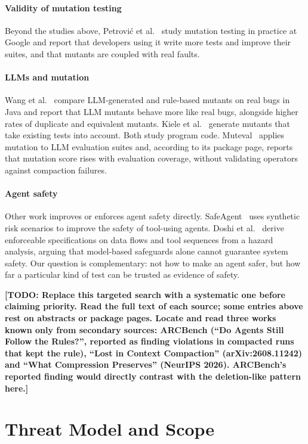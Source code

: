 \documentclass[manuscript,screen,nonacm]{acmart}
\newcommand{\todo}[1]{\textbf{[TODO: #1]}}
\begin{document}
\paragraph{Validity of mutation testing} Beyond the studies above, Petrovi\'c et al.~\cite{petrovic2021} study mutation testing in practice at Google and report that developers using it write more tests and improve their suites, and that mutants are coupled with real faults.

\paragraph{LLMs and mutation} Wang et al.~\cite{wang2024} compare LLM-generated and rule-based mutants on real bugs in Java and report that LLM mutants behave more like real bugs, alongside higher rates of duplicate and equivalent mutants. Kiele et al.~\cite{kiele2026} generate mutants that take existing tests into account. Both study program code. Muteval~\cite{muteval} applies mutation to LLM evaluation suites and, according to its package page, reports that mutation score rises with evaluation coverage, without validating operators against compaction failures.

\paragraph{Agent safety} Other work improves or enforces agent safety directly. SafeAgent~\cite{zhou2026} uses synthetic risk scenarios to improve the safety of tool-using agents. Doshi et al.~\cite{doshi2026} derive enforceable specifications on data flows and tool sequences from a hazard analysis, arguing that model-based safeguards alone cannot guarantee system safety. Our question is complementary: not how to make an agent safer, but how far a particular kind of test can be trusted as evidence of safety.

\todo{Replace this targeted search with a systematic one before claiming priority. Read the full text of each source; some entries above rest on abstracts or package pages. Locate and read three works known only from secondary sources: ARCBench (``Do Agents Still Follow the Rules?'', reported as finding violations in compacted runs that kept the rule), ``Lost in Context Compaction'' (arXiv:2608.11242) and ``What Compression Preserves'' (NeurIPS 2026). ARCBench's reported finding would directly contrast with the deletion-like pattern here.}

\section{Threat Model and Scope}
\end{document}
